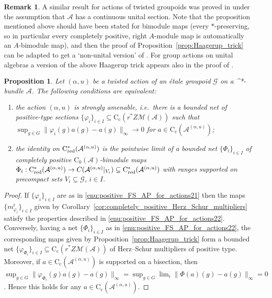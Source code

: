 \documentclass[11 pt, leqno]{amsart}
\numberwithin{equation}{section}
\theoremstyle{plain}
\newtheorem {prop}[thm] {Proposition}
\theoremstyle{definition}
\newtheorem {rem} [thm]{Remark}
\newcommand*{\contc}{\mathrm{C_c}}%
\newcommand*{\contz}{\mathrm{C_0}}%
\DeclareMathOperator{\red}{red}%
\DeclareMathOperator{\rd}{r}%
\newcommand{\M}{\mathcal M}
\newcommand{\m}{m}
\newcommand{\G}{\mathcal G} %
\newcommand{\A}{\mathcal A}
\newcommand{\cst}{\ifmmode\mathrm{C}^*\else{$\mathrm{C}^*$}\fi}
\begin{document}
\begin{rem}
A similar result for actions of twisted groupoids was proved in \cite[Proposition 4.1]{BartoszKangAdam} under the assumption that $\A$ has a continuous unital section. 
Note that the proposition mentioned above should have been stated for bimodule maps (every $*$-preserving, so in particular every completely positive, right $A$-module map is automatically an $A$-bimodule map), and then the proof of Proposition~\ref{prop:Haagerup_trick} can be adapted to get a `non-unital version' of \cite[Proposition 4.1]{BartoszKangAdam}. 
For group actions on unital algebras a version of the above Haagerup trick appears also in the proof of \cite[Theorem 3.6]{dong_ruan}.
\end{rem}

\begin{prop}\label{prop:positive_FS_AP_for_actions3} 
Let $(\alpha,u)$ be  a twisted action of an \'etale groupoid $\G$ on a \cst-bundle $\A$. 
The following conditions are equivalent:
\begin{enumerate}
    \item\label{enu:positive_FS_AP_for_actions21} the action $(\alpha,u)$ is \emph{strongly amenable}, i.e.\ there is a bounded net  of positive-type sections $\{\varphi_i\}_{i\in I}\subseteq \contc(r^*Z\M(\A))$ such that $\sup_{g\in G} \|\varphi_i(g)a(g) - a(g)\|_{\infty}\longrightarrow 0$ for $a \in \contc(\A^{(\alpha,u)})$; 
    \item\label{enu:positive_FS_AP_for_actions22} the identity on $\cst_{\red}(\A^{(\alpha,u)})$ is the pointwise limit of a bounded net $\{\Phi_{i}\}_{i\in I}$ of completely positive $\contz(\A)$-bimodule maps $\Phi_i:\cst_{\red}(\A^{(\alpha,u)})\to C(\A^{(\alpha,u)}|_{V_i})\subseteq \cst_{\red}(\A^{(\alpha,u)})$ with ranges supported on precompact sets $V_i\subseteq \G$, $i\in I$. 
\end{enumerate}
\end{prop}
\begin{proof} 
If $\{\varphi_i\}_{i\in I}$ are as in \ref{enu:positive_FS_AP_for_actions21} then the maps $\{\m_{\varphi_i}^{\rd}\}_{i\in I}$ given by Corollary~\ref{cor:completely_positive_Herz_Schur_multipliers} satisfy the properties described in \ref{enu:positive_FS_AP_for_actions22}. 
Conversely, having a net $\{\Phi_{i}\}_{i\in I}$ as in \ref{enu:positive_FS_AP_for_actions22}, the corresponding maps given by Proposition~\ref{prop:Haagerup_trick} form a bounded net $\{ \varphi_{\Phi_i} \}_{i\in I} \subseteq \contc(r^*Z\M(\A))$ of Herz--Schur multipliers of positive type. 
Moreover, if $a \in \contc(\A^{(\alpha,u)})$ is supported on a bisection, then $\sup_{g\in G} \| \varphi_{\Phi_i}(g)a(g) - a(g) \|_{\infty} = \sup_{g\in G} \lim_{i} \| \Phi(a)(g)  - a(g) \|_{\infty} = 0$.
Hence this holds for any $a \in \contc(\A^{(\alpha,u)})$. 
\end{proof}
\end{document}
